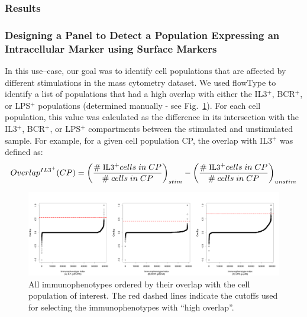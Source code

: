 \subsubsection*{Results}


\subsubsection{Designing a Panel to Detect a Population Expressing an Intracellular Marker using Surface Markers}
In this use--case, our goal was to identify cell populations that are affected by different stimulations in the mass cytometry dataset.
We used flowType to identify a list of populations that had a high overlap with either the IL3$^+$, BCR$^+$, or LPS$^+$ populations (determined manually - see Fig.~\ref{r1:overlaps}).
For each cell population, this value was calculated as the difference in its intersection with the IL3$^+$, BCR$^+$, or LPS$^+$ compartments between the stimulated and unstimulated sample.
For example, for a given cell population CP, the overlap with IL3$^+$ was defined as:
\begin{equation}\small
  Overlap^{IL3^+}(CP)=\left(\frac{\# \; \mbox{IL3}^+cells \; in \; CP}{\# \; cells \; in \; CP}\right)_{stim}-  \left(\frac{\# \; \mbox{IL3}^+cells \; in \; CP}{\# \; cells \; in \; CP}\right)_{unstim}
\end{equation}

\begin{figure}[!ht]
  \begin{center}
    \includegraphics[width=\textwidth]{figs/rchy/figs/overlaps}
  \end{center}
  \caption{All immunophenotypes ordered by their overlap with the cell population of interest. The red dashed lines indicate the cutoffs used for selecting the immunophenotypes with ``high overlap''.}
  \label{r1:overlaps}
\end{figure}


